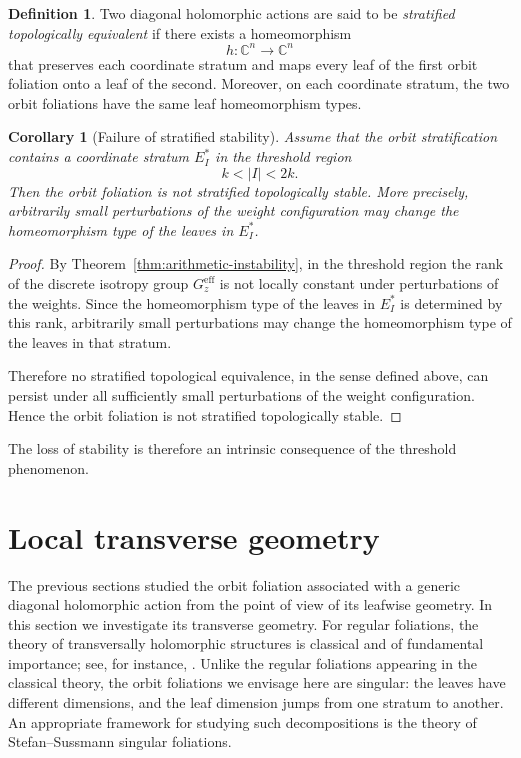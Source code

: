 \documentclass[11pt]{amsart}
\newtheorem{corollary}[theorem]{Corollary}
\theoremstyle{definition}
\newtheorem{definition}[theorem]{Definition}
\theoremstyle{remark}
\newcommand{\C}{\mathbb{C}}
\newcommand{\stratSS}[1]{E_{#1}^*}
\newcommand{\stratS}[1]{\stratSS{#1}}
\begin{document}
\begin{definition}
Two diagonal holomorphic actions are said to be \emph{stratified topologically equivalent} if there exists a homeomorphism
\[
    h:\C^n\longrightarrow\C^n
\]
that preserves each coordinate stratum and maps every leaf of the first orbit foliation onto a leaf of the second. Moreover, on each coordinate stratum, the two orbit foliations have the same leaf homeomorphism types.
\end{definition}


\begin{corollary}[Failure of stratified stability]
	\label{cor:no-stratified-stability}
	Assume that the orbit stratification contains a coordinate stratum $\stratS{I}$ in the threshold region 
	$$ 
		k<|I|<2k.
	$$
	Then the orbit foliation is not stratified topologically stable.
	More precisely, arbitrarily small perturbations of the weight configuration may change the homeomorphism type of the leaves in $\stratS{I}$.
\end{corollary}

\begin{proof}
	By Theorem~\ref{thm:arithmetic-instability}, in the threshold region the rank of the discrete isotropy group $G_z^{\mathrm{eff}}$ is not locally constant under perturbations of the weights.
	Since the homeomorphism type of the leaves in $\stratS{I}$ is determined by this rank, arbitrarily small perturbations may change the homeomorphism type of the leaves in that stratum.

	Therefore no stratified topological equivalence, in the sense defined above, can persist under all sufficiently small perturbations of the weight configuration.
	Hence the orbit foliation is not stratified topologically stable.
\end{proof}

The loss of stability is therefore an intrinsic consequence of the threshold phenomenon.

\section{Local transverse geometry}\label{sec:transverse}

The previous sections studied the orbit foliation associated with a generic diagonal holomorphic action from the point of view of its leafwise geometry.
In this section we investigate its transverse geometry.
For regular foliations, the theory of transversally holomorphic structures is classical and of fundamental importance; see, for instance, \cite{Ha,GHS,GM1,GM2,GM3, GGmS, GN,LN,Bru,Bru-Gh}.
Unlike the regular foliations appearing in the classical theory, the orbit foliations we envisage here are singular: the leaves have different dimensions, and the leaf dimension jumps from one stratum to another.
An appropriate framework for studying such decompositions is the theory of Stefan--Sussmann singular foliations.
\end{document}
